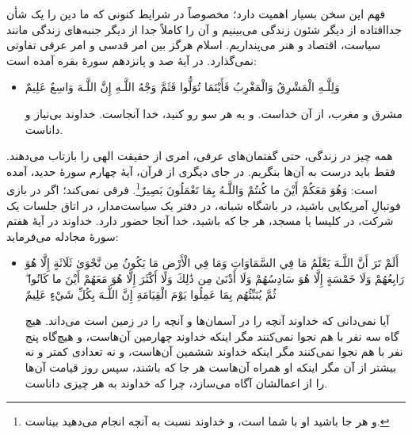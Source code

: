 فهم این سخن بسیار اهمیت دارد؛ مخصوصاً در شرایط کنونی که ما دین را یک شأن جداافتاده از دیگر شئون زندگی می‌بینیم و آن را کاملاً جدا از دیگر جنبه‌های زندگی مانند سیاست، اقتصاد و هنر می‌پنداریم. اسلام هرگز بین امر قدسی و امر عرفی تفاوتی نمی‌گذارد. در آیهٔ صد و پانزدهم سورهٔ بقره آمده است: 

\begin{itemize}
	\item[]
	
	{
		وَلِلَّـهِ الْمَشْرِقُ وَالْمَغْرِبُ  فَأَيْنَمَا تُوَلُّوا فَثَمَّ وَجْهُ اللَّـهِ  إِنَّ اللَّـهَ وَاسِعٌ عَلِيمٌ
	}
	
	{
		مشرق و مغرب، از آن خداست. و به هر سو رو کنید، خدا آنجاست. خداوند بی‌نیاز و داناست.
	}
\end{itemize}

همه چیز در زندگی، حتی گفتمان‌های عرفی، امری از حقیقت الهی را بازتاب می‌دهند. فقط باید درست به آن‌ها بنگریم. در جای دیگری از قرآن، آیهٔ چهارم سورهٔ حدید، آمده است:  { وَهُوَ مَعَكُمْ أَيْنَ ما كُنتُمْ  وَاللَّـهُ بِمَا تَعْمَلُونَ بَصِيرٌ}\footnote{و هر جا باشید او با شما است، و خداوند نسبت به آنچه انجام می‌دهید بیناست.}. فرقی نمی‌کند؛ اگر در بازی فوتبالِ آمریکایی باشید، در باشگاه شبانه، در دفتر یک سیاست‌مدار، در اتاق جلسات یک شرکت، در کلیسا یا مسجد، هر جا که باشید، خدا آنجا حضور دارد. خداوند در آیهٔ هفتم سورهٔ‌ مجادله می‌فرماید:

\begin{itemize}
	\item[]
	{
		أَلَمْ تَرَ أَنَّ اللَّـهَ يَعْلَمُ مَا فِي السَّمَاوَاتِ وَمَا فِي الْأَرْضِ مَا يَكُونُ مِن نَّجْوَىٰ ثَلَاثَةٍ إِلَّا هُوَ رَابِعُهُمْ وَلَا خَمْسَةٍ إِلَّا هُوَ سَادِسُهُمْ وَلَا أَدْنَىٰ مِن ذَٰلِكَ وَلَا أَكْثَرَ إِلَّا هُوَ مَعَهُمْ أَيْنَ ما كَانُوا ۖ ثُمَّ يُنَبِّئُهُم بِمَا عَمِلُوا يَوْمَ الْقِيَامَةِ إِنَّ اللَّـهَ بِكُلِّ شَيْءٍ عَلِيمٌ
	}
	
	{
		آیا نمی‌دانی که خداوند آنچه را در آسمان‌ها و آنچه را در زمین است می‌داند. هیچ گاه سه نفر با هم نجوا نمی‌کنند مگر اینکه خداوند چهارمین آن‌هاست، و هیچ‌گاه پنج نفر با هم نجوا نمی‌کنند مگر اینکه خداوند ششمین آن‌هاست، و نه تعدادی کمتر و نه بیشتر از آن مگر اینکه او همراه آن‌هاست هر جا که باشند، سپس روز قیامت آن‌ها را از اعمالشان آگاه می‌سازد، چرا که خداوند به هر چیزی داناست. 
	}
\end{itemize}

